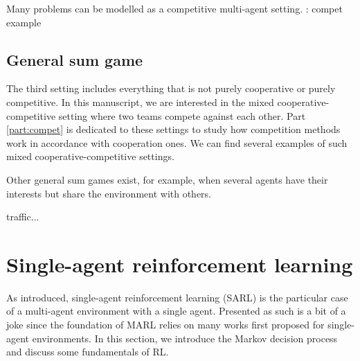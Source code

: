 Many problems can be modelled as a competitive multi-agent setting.
\todo: compet example



\subsection{General sum game} 
\label{sec:ch2_general_sum_game}
The third setting includes everything that is not purely cooperative or purely competitive.
In this manuscript, we are interested in the mixed cooperative-competitive setting where two teams compete against each other.
Part \ref{part:compet} is dedicated to these settings to study how competition methods work in accordance with cooperation ones.
\todo We can find several examples of such mixed cooperative-competitive settings.


Other general sum games exist, for example, when several agents have their interests but share the environment with others.

\todo traffic...


\section{Single-agent reinforcement learning} 
\label{sec:ch2_single_agent_RL}
As introduced, single-agent reinforcement learning (SARL) is the particular case of a multi-agent environment with a single agent.
Presented as such is a bit of a joke since the foundation of MARL relies on many works first proposed for single-agent environments.
In this section, we introduce the Markov decision process and discuss some fundamentals of RL.

